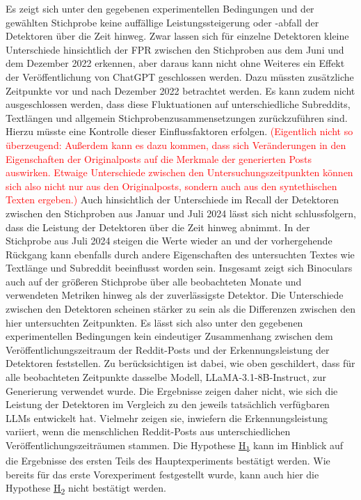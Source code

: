 Es zeigt sich unter den gegebenen experimentellen Bedingungen und der gewählten Stichprobe keine auffällige Leistungssteigerung oder -abfall der Detektoren über die Zeit hinweg. Zwar lassen sich für einzelne Detektoren kleine Unterschiede hinsichtlich der FPR zwischen den Stichproben aus dem Juni und dem Dezember 2022 erkennen, aber daraus kann nicht ohne Weiteres ein Effekt der Veröffentlichung von ChatGPT geschlossen werden. Dazu müssten zusätzliche Zeitpunkte vor und nach Dezember 2022 betrachtet werden. Es kann zudem nicht ausgeschlossen werden, dass diese Fluktuationen auf unterschiedliche Subreddits, Textlängen und allgemein Stichprobenzusammensetzungen zurückzuführen sind. Hierzu müsste eine Kontrolle dieser Einflussfaktoren erfolgen. \textcolor{red}{(Eigentlich nicht so überzeugend: Außerdem kann es dazu kommen, dass sich Veränderungen in den Eigenschaften der Originalposts auf die Merkmale der generierten Posts auswirken. Etwaige Unterschiede zwischen den Untersuchungszeitpunkten können sich also nicht nur aus den Originalposts, sondern auch aus den syntethischen Texten ergeben.)}  Auch hinsichtlich der Unterschiede im Recall der Detektoren zwischen den Stichproben aus Januar und Juli 2024 lässt sich nicht schlussfolgern, dass die Leistung der Detektoren über die Zeit hinweg abnimmt. In der Stichprobe aus Juli 2024 steigen die Werte wieder an und der vorhergehende Rückgang kann ebenfalls durch andere Eigenschaften des untersuchten Textes wie Textlänge und Subreddit beeinflusst worden sein.
Insgesamt zeigt sich Binoculars auch auf der größeren Stichprobe über alle beobachteten Monate und verwendeten Metriken hinweg als der zuverlässigste Detektor. Die Unterschiede zwischen den Detektoren scheinen stärker zu sein als die Differenzen zwischen den hier untersuchten Zeitpunkten. Es lässt sich also unter den gegebenen experimentellen Bedingungen kein eindeutiger Zusammenhang zwischen dem Veröffentlichungszeitraum der Reddit-Posts und der Erkennungsleistung der Detektoren feststellen. Zu berücksichtigen ist dabei, wie oben geschildert, dass für alle beobachteten Zeitpunkte dasselbe Modell, LLaMA-3.1-8B-Instruct, zur Generierung verwendet wurde. Die Ergebnisse zeigen daher nicht, wie sich die Leistung der Detektoren im Vergleich zu den jeweils tatsächlich verfügbaren LLMs entwickelt hat. Vielmehr zeigen sie, inwiefern die Erkennungsleistung variiert, wenn die menschlichen Reddit-Posts aus unterschiedlichen Veröffentlichungszeiträumen stammen. Die Hypothese \hyperlink{hp:1}{H\textsubscript{1}} kann im Hinblick auf die Ergebnisse des ersten Teils des Hauptexperiments bestätigt werden. Wie bereits für das erste Vorexperiment festgestellt wurde, kann auch hier die Hypothese \hyperlink{hp:2}{H\textsubscript{2}} nicht bestätigt werden. \\
